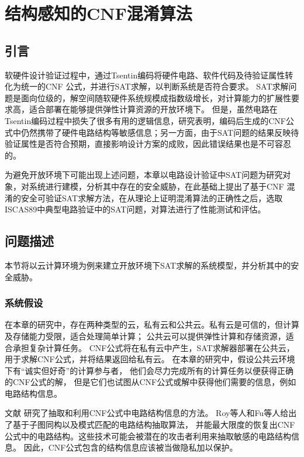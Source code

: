 \chapter{结构感知的CNF混淆算法}
\label{chap:3}

\section{引言}%
软硬件设计验证过程中，通过Tsentin编码\cite{Tseitin}将硬件电路、软件代码及待验证属性转化为统一的CNF
公式，并进行SAT求解，以判断系统是否符合要求。
SAT求解问题是面向位级的，解空间随软硬件系统规模成指数级增长，对计算能力的扩展性要求高，适合部署在能够提供弹性计算资源的开放环境下。
但是，虽然电路在Tsentin编码过程中损失了很多有用的逻辑信息，研究表明，编码后生成的CNF公式中仍然携带了硬件电路结构等敏感信息；另一方面，由于SAT问题的结果反映待验证属性是否符合预期，直接影响设计方案的成败，因此错误结果也是不可容忍的。

为避免开放环境下可能出现上述问题，本章以电路设计验证中SAT问题为研究对象，对系统进行建模，分析其中存在的安全威胁，在此基础上提出了基于CNF 混淆的安全可验证SAT求解方法，在从理论上证明混淆算法的正确性之后，选取ISCAS89中典型电路验证中的SAT问题，对算法进行了性能测试和评估。
\section{问题描述}
本节将以云计算环境为例来建立开放环境下SAT求解的系统模型，并分析其中的安全威胁。
\subsection{系统假设}

在本章的研究中，存在两种类型的云，私有云和公共云。私有云是可信的，但计算及存储能力受限，适合处理简单计算；
公共云可以提供弹性计算和存储资源，适合承担复杂计算任务。
CNF公式将在私有云中产生，SAT求解器部署在公共云，用于求解CNF公式，并将结果返回给私有云。
在本章的研究中，假设公共云环境下有“诚实但好奇”的计算参与者，
他们会尽力完成所有的计算任务以便获得正确的CNF公式的解，
但是它们也试图从CNF公式或解中获得他们需要的信息，例如电路结构信息。

文献\cite{csLiequivalency,csOstrowski,csRoy,csFu}
研究了抽取和利用CNF公式中电路结构信息的方法。
Roy等人\cite{csRoy}和Fu等人\cite{csFu}给出了基于子图同构以及模式匹配的电路结构抽取算法，
并能最大限度的恢复出CNF公式中的电路结构。这些技术可能会被潜在的攻击者利用来抽取敏感的电路结构信息。
因此，CNF公式包含的结构信息应该被当做隐私加以保护。

